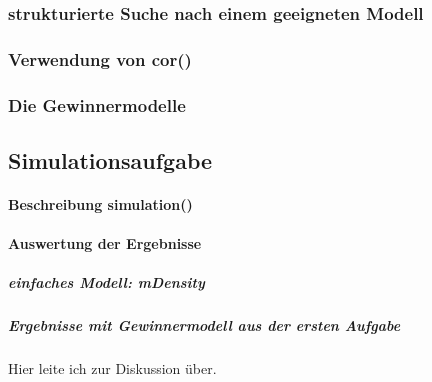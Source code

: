 \subsubsection{strukturierte Suche nach einem geeigneten Modell}
\subsubsection{Verwendung von cor()}
\subsubsection{Die Gewinnermodelle}

\newpage 
\subsection{Simulationsaufgabe}
\paragraph{Beschreibung simulation()}
\paragraph{Auswertung der Ergebnisse}
\subparagraph{einfaches Modell: \textit{mDensity}}
\subparagraph{Ergebnisse mit Gewinnermodell aus der ersten Aufgabe}
Hier leite ich zur Diskussion \"uber.